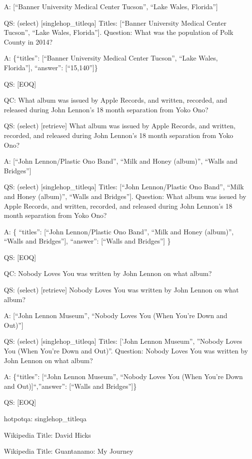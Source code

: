 \documentclass[
]{article}
\begin{document}
A: {[}``Banner University Medical Center Tucson'', ``Lake Wales,
Florida''{]}

QS: (select) {[}singlehop\_titleqa{]} Titles: {[}``Banner University
Medical Center Tucson'', ``Lake Wales, Florida''{]}. Question: What was
the population of Polk County in 2014?

A: \{``titles'': {[}``Banner University Medical Center Tucson'', ``Lake
Wales, Florida''{]}, ``answer'': {[}``15,140''{]}\}

QS: {[}EOQ{]}

QC: What album was issued by Apple Records, and written, recorded, and
released during John Lennon's 18 month separation from Yoko Ono?

QS: (select) {[}retrieve{]} What album was issued by Apple Records, and
written, recorded, and released during John Lennon's 18 month separation
from Yoko Ono?

A: {[}``John Lennon/Plastic Ono Band'', ``Milk and Honey (album)'',
``Walls and Bridges''{]}

QS: (select) {[}singlehop\_titleqa{]} Titles: {[}``John Lennon/Plastic
Ono Band'', ``Milk and Honey (album)'', ``Walls and Bridges''{]}.
Question: What album was issued by Apple Records, and written, recorded,
and released during John Lennon's 18 month separation from Yoko Ono?

A: \{ ``titles'': {[}``John Lennon/Plastic Ono Band'', ``Milk and Honey
(album)'', ``Walls and Bridges''{]}, ``answer'': {[}``Walls and
Bridges''{]} \}

QS: {[}EOQ{]}

QC: Nobody Loves You was written by John Lennon on what album?

QS: (select) {[}retrieve{]} Nobody Loves You was written by John Lennon
on what album?

A: {[}``John Lennon Museum'', ``Nobody Loves You (When You're Down and
Out)''{]}

QS: (select) {[}singlehop\_titleqa{]} Titles: {[}'John Lennon Museum'',
''Nobody Loves You (When You're Down and Out)''. Question: Nobody Loves
You was written by John Lennon on what album?

A: \{``titles'': {[}``John Lennon Museum'', ``Nobody Loves You (When
You're Down and Out){]}``,''answer'': {[}``Walls and Bridges''{]}\}

QS: {[}EOQ{]}

hotpotqa: singlehop\_titleqa

Wikipedia Title: David Hicks

Wikipedia Title: Guantanamo: My Journey
\end{document}
